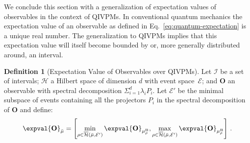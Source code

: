 \documentclass[english,reprint, aps, prl,superscriptaddress, showpacs,
showkeys, longbibliography, amsmath, amssymb, floatfix]{revtex4-1}
\theoremstyle{plain}
\theoremstyle{definition}
\newtheorem{definition}{Definition}
\newcommand{\Hilb}{\mathcal{H}}
\newcommand{\events}{\ensuremath{\mathcal{E}}}
\newcommand{\coreBorn}{\ensuremath{\overline{\Hilb}}}
\begin{document}
We conclude this section with a generalization of expectation values
of observables in the context of QIVPMs. In conventional quantum
mechanics the expectation value of an observable as defined in
Eq.~\eqref{eq:quantum-expectation} is a unique real number. The
generalization to QIVPMs implies that this expectation value will
itself become bounded by or, more generally distributed around, an interval. 

\begin{definition}[Expectation Value of Observables over QIVPMs] Let
  $\mathscr{I}$ be a set of intervals; $\Hilb$ a Hilbert space of
  dimension $d$ with event space~$\events$; and $\mathbf{O}$ an
  observable with spectral decomposition
  $\Sigma_{i=1}^d \lambda_iP_i$. Let $\events'$ be the minimal
  subspace of events containing all the projectors $P_i$ in the
  spectral decomposition of $\mathbf{O}$ and define:
\begin{equation}
\expval{\mathbf{O}}_{\bar{\mu}}=\left[\min_{\rho\in\coreBorn\left(\bar{\mu},\events'\right)}
\expval{\mathbf{O}}_{\mu_{\rho}^{\mathrm{B}}},\max_{\rho\in\coreBorn\left(\bar{\mu},\events'\right)}
\expval{\mathbf{O}}_{\mu_{\rho}^{\mathrm{B}}}\right]\,. \label{eq:quantum-interval-expectation-core}
\end{equation}
\end{definition}
\end{document}

